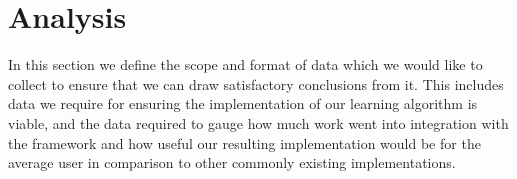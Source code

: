 \section{Analysis}
In this section we define the scope and format of data which we would like to collect to ensure that we can draw satisfactory conclusions from it.
This includes data we require for ensuring the implementation of our learning algorithm is viable, and the data required to gauge how much work went into integration with the framework and how useful our resulting implementation would be for the average user in comparison to other commonly existing implementations.


